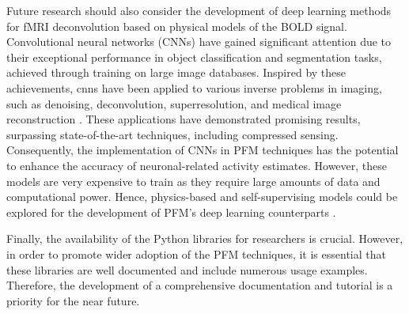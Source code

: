 Future research should also consider the development of deep learning methods
for fMRI deconvolution based on physical models of the BOLD signal.
Convolutional neural networks (CNNs) have gained significant attention due to
their exceptional performance in object classification and segmentation tasks,
achieved through training on large image databases. Inspired by these
achievements, \acrshort*{cnn}s have been applied to various inverse problems in
imaging, such as denoising, deconvolution, superresolution, and medical image
reconstruction
\citep{McCann2017ConvolutionalNeuralNetworks,Wang2020Multiresolutionconvolutional}.
These applications have demonstrated promising results, surpassing
state-of-the-art techniques, including compressed sensing. Consequently, the
implementation of CNNs in PFM techniques has the potential to enhance the
accuracy of neuronal-related activity estimates. However, these models are very
expensive to train as they require large amounts of data and computational
power. Hence, physics-based and self-supervising models could be explored for
the development of PFM's deep learning counterparts
\citep{Lucas2018UsingDeepNeural,LopezTapia2021Deeplearningapproaches,Hammernik2023PhysicsDrivenDeep,Aggarwal2019MoDLModelBased}.

Finally, the availability of the Python libraries for researchers is crucial.
However, in order to promote wider adoption of the PFM techniques, it is
essential that these libraries are well documented and include numerous usage
examples. Therefore, the development of a comprehensive documentation and
tutorial is a priority for the near future.
